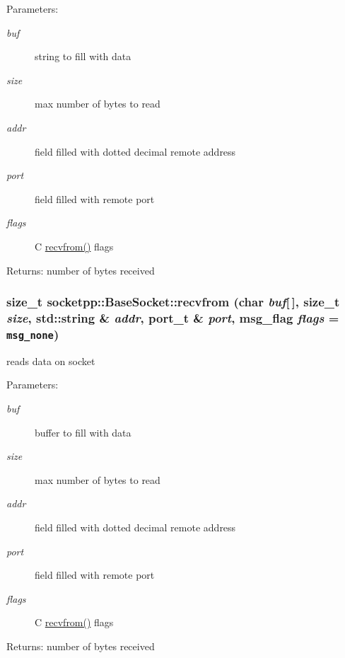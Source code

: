 \begin{CompactItemize}
\begin{Desc}
\item[Parameters:]
\begin{description}
\item[{\em buf}]string to fill with data \item[{\em size}]max number of bytes to read \item[{\em addr}]field filled with dotted decimal remote address \item[{\em port}]field filled with remote port \item[{\em flags}]C \hyperlink{classsocketpp_1_1BaseSocket_6a207860c0a1328dc05bea32bb62e81f}{recvfrom()} flags \end{description}
\end{Desc}
\begin{Desc}
\item[Returns:]number of bytes received \end{Desc}
\hypertarget{classsocketpp_1_1BaseSocket_9cc42afe664fc31970e166a3b2ea0591}{
\subsubsection[{recvfrom}]{\setlength{\rightskip}{0pt plus 5cm}size\_\-t socketpp::BaseSocket::recvfrom (char {\em buf}\mbox{[}$\,$\mbox{]}, \/  size\_\-t {\em size}, \/  std::string \& {\em addr}, \/  port\_\-t \& {\em port}, \/  msg\_\-flag {\em flags} = {\tt msg\_\-none})}}
\label{classsocketpp_1_1BaseSocket_9cc42afe664fc31970e166a3b2ea0591}


reads data on socket 

\begin{Desc}
\item[Parameters:]
\begin{description}
\item[{\em buf}]buffer to fill with data \item[{\em size}]max number of bytes to read \item[{\em addr}]field filled with dotted decimal remote address \item[{\em port}]field filled with remote port \item[{\em flags}]C \hyperlink{classsocketpp_1_1BaseSocket_6a207860c0a1328dc05bea32bb62e81f}{recvfrom()} flags \end{description}
\end{Desc}
\begin{Desc}
\item[Returns:]number of bytes received \end{Desc}
\hypertarget{classsocketpp_1_1BaseSocket_8241347ca77942e2bb1449d117ac7248}{
}
\end{CompactItemize}
